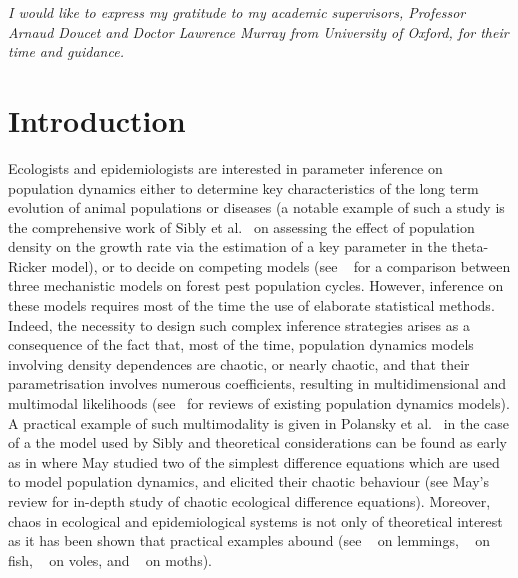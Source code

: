 \documentclass[12pt]{article}
\begin{document}
	\newpage
	\vspace*{80mm}
		\textit{I would like to express my gratitude to my academic supervisors, Professor Arnaud Doucet and Doctor Lawrence Murray from University of Oxford, for their time and guidance.}
	
	\newpage
	
	{\hypersetup{hidelinks}
	\listoffigures
	}
	\clearpage
	{\hypersetup{hidelinks}
	\listoftables
	}
	\clearpage
	{\hypersetup{hidelinks}
		\tableofcontents
	}
	
	\clearpage
	\section{Introduction}
	Ecologists and epidemiologists are interested in parameter inference on population dynamics either to determine key characteristics of the long term evolution of animal populations or diseases (a notable example of such a study is the comprehensive work of Sibly et al.~\cite{sibly2005regulation} on assessing the effect of population density on the growth rate via the estimation of a key parameter in the theta-Ricker model), or to decide on competing models (see ~\cite{kendall2005population} for a comparison between three mechanistic models on forest pest population cycles. However, inference on these models requires most of the time the use of elaborate statistical methods. Indeed, the necessity to design such complex inference strategies arises as a consequence of the fact that, most of the time, population dynamics models involving density dependences are chaotic, or nearly chaotic, and that their parametrisation involves numerous coefficients, resulting in multidimensional and multimodal likelihoods (see~\cite{hanski1990density, woiwod1992patterns, turchin2003complex, brook2006strength} for reviews of existing population dynamics models). A practical example of such multimodality is given in Polansky et al.~\cite{polansky2009likelihood} in the case of a the model used by Sibly and theoretical considerations can be found as early as in \cite{may1975biological} where May studied two of the simplest difference equations which are used to model population dynamics, and elicited their chaotic behaviour (see May's~\cite{may1986search, may1989chaotic} review for in-depth study of chaotic ecological difference equations). Moreover, chaos in ecological and epidemiological systems is not only of theoretical interest as it has been shown that practical examples abound (see ~\cite{kausrud2008linking} on lemmings, ~\cite{anderson2008fishing} on fish, ~\cite{turchin2000living} on voles, and ~\cite{kendall2005population} on moths). \\
\end{document}
